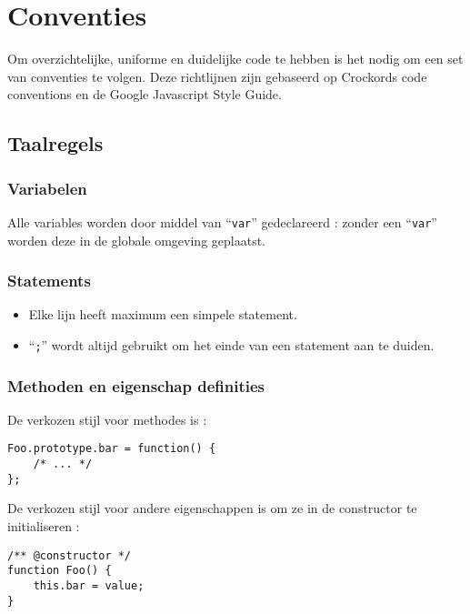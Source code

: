 \section{Conventies}

Om overzichtelijke, uniforme en duidelijke code te hebben is het nodig om een set van conventies te volgen. Deze richtlijnen zijn gebaseerd op Crockords code conventions\cite{ccd}
en de Google Javascript Style Guide\cite{gjsg}.

\subsection{Taalregels}

\subsubsection{Variabelen}

Alle variables worden door middel van ``\lstinline{var}'' gedeclareerd : zonder een ``\lstinline{var}'' worden deze in de globale omgeving geplaatst.

\subsubsection{Statements}

\begin{itemize}
  \item Elke lijn heeft maximum een simpele statement.
  \item ``\lstinline{;}'' wordt altijd gebruikt om het einde van een statement aan te duiden.
\end{itemize}

\subsubsection{Methoden en eigenschap definities}

De verkozen stijl voor methodes is :\\
\begin{lstlisting}
Foo.prototype.bar = function() {
    /* ... */
};
\end{lstlisting}

De verkozen stijl voor andere eigenschappen is om ze in de constructor te initialiseren :\\
\begin{lstlisting}
/** @constructor */
function Foo() {
    this.bar = value;
}
\end{lstlisting}

